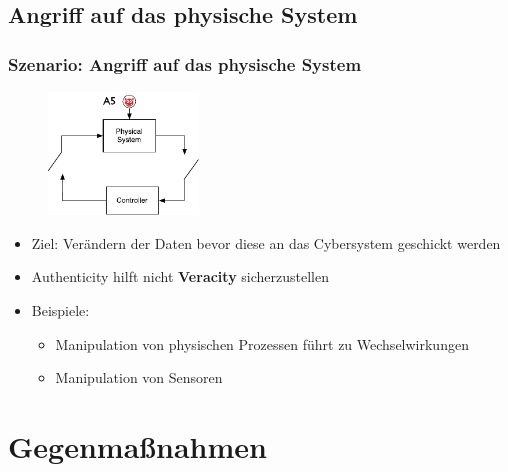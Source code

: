 \documentclass{sikslides}
\begin{document}
    \subsection{Angriff auf das physische System}
    \begin{frame}
        \frametitle{Szenario: Angriff auf das physische System}
        \begin{figure}
            \centering
            \includegraphics[width=4cm]{figure/physical}
        \end{figure}
        \begin{itemize}
            \item Ziel: Verändern der Daten bevor diese an das Cybersystem geschickt werden
            \item Authenticity hilft nicht \textbf{Veracity} sicherzustellen
            \pause
            \item Beispiele:
            \begin{itemize}
                \item Manipulation von physischen Prozessen führt zu Wechselwirkungen
                \item Manipulation von Sensoren
            \end{itemize}
        \end{itemize}
    \end{frame}



    \section{Gegenmaßnahmen}
\end{document}
